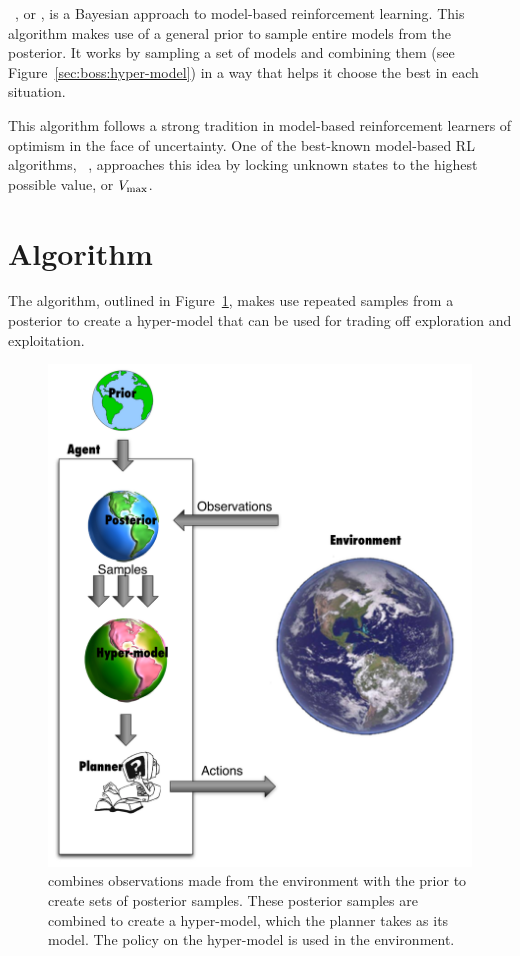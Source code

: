 ~\cite{asmuth09}, or , is a Bayesian approach to model-based reinforcement learning. This algorithm makes use of a general prior to sample entire models from the posterior. It works by sampling a set of models and combining them (see Figure~\ref{sec:boss:hyper-model}) in a way that helps it choose the best in each situation.

This algorithm follows a strong tradition in model-based reinforcement learners of optimism in the face of uncertainty. One of the best-known model-based RL algorithms, ~\cite{brafman03}, approaches this idea by locking unknown states to the highest possible value, or $V_{\rm max}$.

\section{Algorithm}

The  algorithm, outlined in Figure~\ref{boss:fig:boss-general}, makes use repeated samples from a posterior to create a hyper-model that can be used for trading off exploration and exploitation.


\begin{figure}[t]
\begin{center}
\includegraphics[width=0.75\linewidth]{boss-loop}
\caption{ combines observations made from the environment with the prior to create sets of posterior samples. These posterior samples are combined to create a hyper-model, which the planner takes as its model. The policy on the hyper-model is used in the environment.}
\label{boss:fig:boss-general}
\end{center}
\end{figure}

